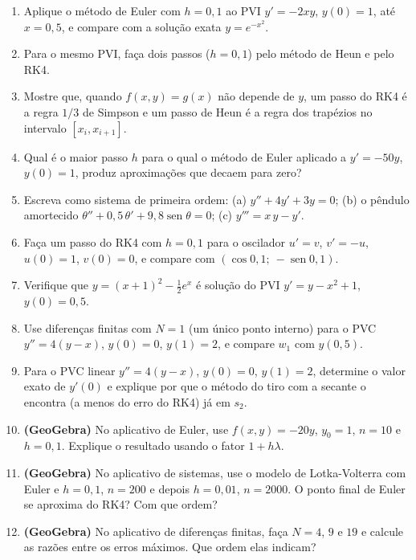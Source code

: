 \begin{enumerate}[label=\textbf{\arabic*.},leftmargin=*]
\item Aplique o método de Euler com $h=0{,}1$ ao PVI $y'=-2xy$, $y(0)=1$, até $x=0{,}5$, e
  compare com a solução exata $y=e^{-x^2}$.

\item Para o mesmo PVI, faça dois passos ($h=0{,}1$) pelo método de Heun e pelo RK4.

\item Mostre que, quando $f(x,y)=g(x)$ não depende de $y$, um passo do RK4 é a regra $1/3$ de
  Simpson e um passo de Heun é a regra dos trapézios no intervalo $[x_i,x_{i+1}]$.

\item Qual é o maior passo $h$ para o qual o método de Euler aplicado a $y'=-50y$, $y(0)=1$,
  produz aproximações que decaem para zero?

\item Escreva como sistema de primeira ordem: (a) $y''+4y'+3y=0$; (b) o pêndulo amortecido
  $\theta''+0{,}5\,\theta'+9{,}8\operatorname{sen}\theta=0$; (c) $y'''=x\,y-y'$.

\item Faça um passo do RK4 com $h=0{,}1$ para o oscilador $u'=v$, $v'=-u$, $u(0)=1$, $v(0)=0$,
  e compare com $(\cos0{,}1;\ -\operatorname{sen}0{,}1)$.

\item Verifique que $y=(x+1)^2-\tfrac12e^x$ é solução do PVI $y'=y-x^2+1$, $y(0)=0{,}5$.

\item Use diferenças finitas com $N=1$ (um único ponto interno) para o PVC $y''=4(y-x)$,
  $y(0)=0$, $y(1)=2$, e compare $w_1$ com $y(0{,}5)$.

\item Para o PVC linear $y''=4(y-x)$, $y(0)=0$, $y(1)=2$, determine o valor exato de $y'(0)$ e
  explique por que o método do tiro com a secante o encontra (a menos do erro do RK4) já em $s_2$.

\item \textbf{(GeoGebra)} No aplicativo de Euler, use $f(x,y)=-20y$, $y_0=1$, $n=10$ e
  $h=0{,}1$. Explique o resultado usando o fator $1+h\lambda$.

\item \textbf{(GeoGebra)} No aplicativo de sistemas, use o modelo de Lotka-Volterra com Euler e
  $h=0{,}1$, $n=200$ e depois $h=0{,}01$, $n=2000$. O ponto final de Euler se aproxima do RK4?
  Com que ordem?

\item \textbf{(GeoGebra)} No aplicativo de diferenças finitas, faça $N=4$, $9$ e $19$ e calcule
  as razões entre os erros máximos. Que ordem elas indicam?
\end{enumerate}

